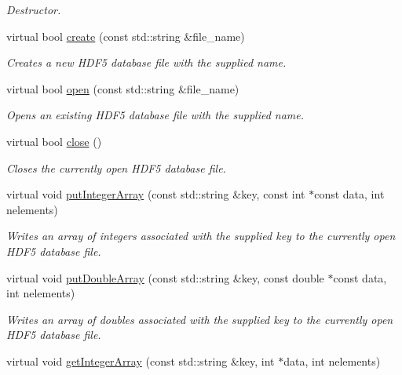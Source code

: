 \begin{DoxyCompactItemize}
\begin{DoxyCompactList}\small\item\em Destructor. \end{DoxyCompactList}\item 
virtual bool \hyperlink{class_c_a_r_o_m_1_1_h_d_f_database_ab86ee99a63cf0259ed1c87d57f3b0960}{create} (const std\-::string \&file\-\_\-name)
\begin{DoxyCompactList}\small\item\em Creates a new H\-D\-F5 database file with the supplied name. \end{DoxyCompactList}\item 
virtual bool \hyperlink{class_c_a_r_o_m_1_1_h_d_f_database_a1dc9c865d0338214b1006e3e447c9137}{open} (const std\-::string \&file\-\_\-name)
\begin{DoxyCompactList}\small\item\em Opens an existing H\-D\-F5 database file with the supplied name. \end{DoxyCompactList}\item 
virtual bool \hyperlink{class_c_a_r_o_m_1_1_h_d_f_database_a94c9a5972e98e4426c3bdc255ee1dfdc}{close} ()
\begin{DoxyCompactList}\small\item\em Closes the currently open H\-D\-F5 database file. \end{DoxyCompactList}\item 
virtual void \hyperlink{class_c_a_r_o_m_1_1_h_d_f_database_a8f628624800817cdbe90ab0407c28305}{put\-Integer\-Array} (const std\-::string \&key, const int $\ast$const data, int nelements)
\begin{DoxyCompactList}\small\item\em Writes an array of integers associated with the supplied key to the currently open H\-D\-F5 database file. \end{DoxyCompactList}\item 
virtual void \hyperlink{class_c_a_r_o_m_1_1_h_d_f_database_ad30894245e7ce642f24be9328b86b91b}{put\-Double\-Array} (const std\-::string \&key, const double $\ast$const data, int nelements)
\begin{DoxyCompactList}\small\item\em Writes an array of doubles associated with the supplied key to the currently open H\-D\-F5 database file. \end{DoxyCompactList}\item 
virtual void \hyperlink{class_c_a_r_o_m_1_1_h_d_f_database_a9c12c03cef05d3144c21de5f52ff7494}{get\-Integer\-Array} (const std\-::string \&key, int $\ast$data, int nelements)

\end{DoxyCompactItemize}

